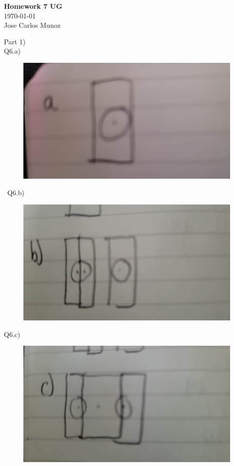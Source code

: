 \documentclass[12pt,english]{article}
\begin{document}
\begin{center}
    \Large
    \textbf{Homework 7 UG}\\
    \small
    \today\\
    \large
    Jose Carlos Munoz
\end{center}%
Part 1)\\
Q6.a)\\  
\begin{figure}[H]
  \includegraphics[width=\linewidth]{a.jpg}
\end{figure}\
Q6.b)\\
\begin{figure}[H]
  \includegraphics[width=\linewidth]{b.jpg}
\end{figure}
Q6.c)\\
\begin{figure}[H]
  \includegraphics[width=\linewidth]{c.jpg}
\end{figure}
\end{document}
